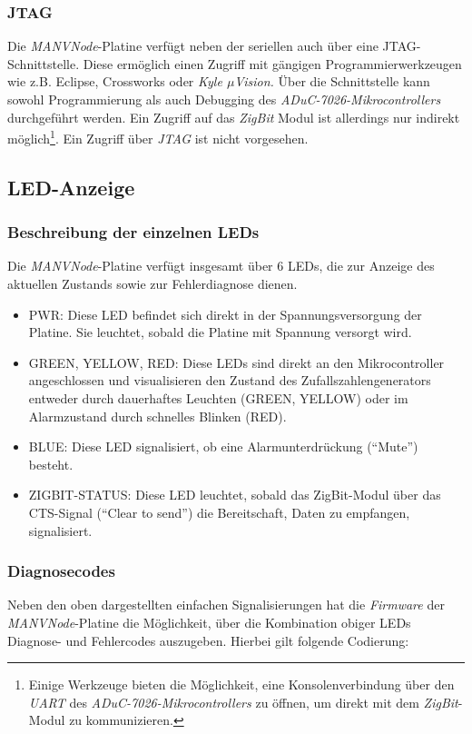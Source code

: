 \subsubsection{JTAG}
Die \emph{MANVNode}-Platine verfügt neben der seriellen auch über eine JTAG-Schnittstelle. Diese ermöglich einen Zugriff mit
gängigen Programmierwerkzeugen wie z.B. Eclipse, Crossworks oder \emph{Kyle $\mu{}$Vision.}
Über die Schnittstelle kann sowohl Programmierung als auch Debugging des \emph{ADuC-7026-Mikrocontrollers}
durchgeführt werden. Ein Zugriff auf das \emph{ZigBit} Modul ist allerdings nur indirekt 
möglich\footnote{Einige Werkzeuge bieten die Möglichkeit, eine Konsolenverbindung
über den \emph{UART} des \emph{ADuC-7026-Mikrocontrollers} zu öffnen, um direkt mit dem \emph{ZigBit}-Modul zu
    kommunizieren.}.  Ein Zugriff über \emph{JTAG} ist nicht vorgesehen.

\subsection{LED-Anzeige}

\subsubsection{Beschreibung der einzelnen LEDs}
Die \emph{MANVNode}-Platine verfügt insgesamt über 6 LEDs, die zur Anzeige des aktuellen Zustands sowie zur Fehlerdiagnose dienen.
\begin{itemize}
    \item{PWR:} Diese LED befindet sich direkt in der Spannungsversorgung der Platine. Sie leuchtet, sobald
                die Platine mit Spannung versorgt wird. 
    \item{GREEN, YELLOW, RED}: Diese LEDs sind direkt an den Mikrocontroller angeschlossen und visualisieren den Zustand des
                               Zufallszahlengenerators entweder durch dauerhaftes Leuchten (GREEN, YELLOW) oder im Alarmzustand
                               durch schnelles Blinken (RED). 
    \item{BLUE}: Diese LED signalisiert, ob eine Alarmunterdrückung ("`Mute"') besteht.
    \item{ZIGBIT-STATUS}: Diese LED leuchtet, sobald das ZigBit-Modul über das CTS-Signal ("`Clear to send"') die Bereitschaft, 
                          Daten zu empfangen, signalisiert.
\end{itemize}
                 
    

\subsubsection{Diagnosecodes}
Neben den oben dargestellten einfachen Signalisierungen hat die \emph{Firmware} der \emph{MANVNode}-Platine die 
Möglichkeit, über die Kombination obiger LEDs Diagnose- und Fehlercodes auszugeben. Hierbei gilt folgende Codierung:

